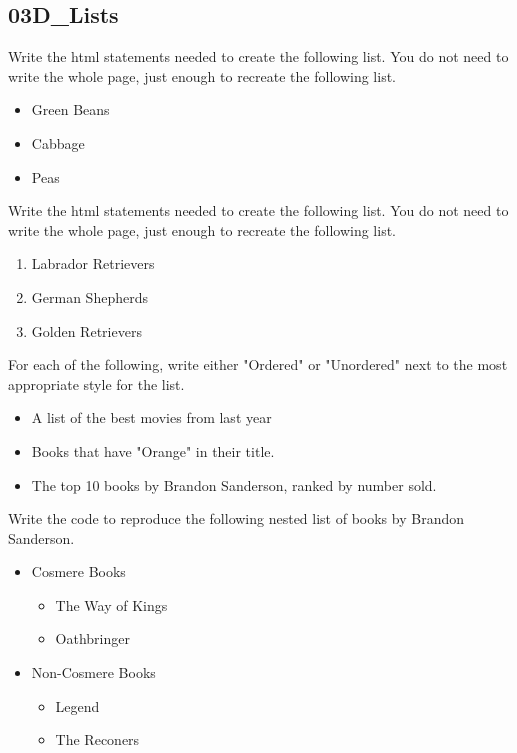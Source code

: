 \documentclass[letterpaper,12pt]{exam}
\begin{document}
\begin{questions}
\begin{samepage}
\section*{03D\_Lists}
\question Write the html statements needed to create the following list.  You do not need to write the whole page, just enough to recreate the following list.
\begin{itemize}
\item Green Beans
\item Cabbage
\item Peas
\vspace{20mm}
\end{itemize} 
\end{samepage}

\begin{samepage}
\question Write the html statements needed to create the following list.  You do not need to write the whole page, just enough to recreate the following list. 
\begin{enumerate}
\item Labrador Retrievers
\item German Shepherds
\item Golden Retrievers
\end{enumerate}
\vspace{20mm}
\end{samepage}

\begin{samepage}
\question For each of the following, write either "Ordered" or "Unordered" next to the most appropriate style for the list. 

\begin{itemize}
\item
\vspace{5mm} \blank\blank A list of the best movies from last year
\item
\vspace{5mm} \blank\blank Books that have "Orange" in their title.
\item
\vspace{5mm} \blank\blank The top 10 books by Brandon Sanderson, ranked by number sold.
\end{itemize}
\end{samepage}

\begin{samepage}
\question Write the code to reproduce the following nested list of books by Brandon Sanderson. 
\begin{itemize}
\item Cosmere Books
	\begin{itemize}
		\item The Way of Kings
		\item Oathbringer
	\end{itemize}
\item Non-Cosmere Books
	\begin{itemize}
		\item Legend
		\item The Reconers
	\end{itemize}
\end{itemize}
\end{samepage}



\end{questions}
\end{document}
